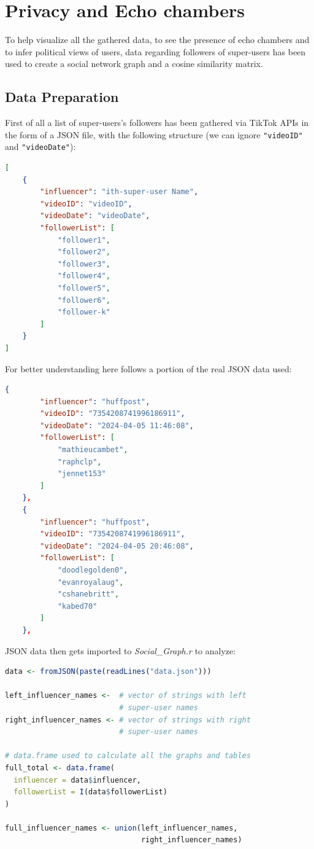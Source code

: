 \section{Privacy and Echo chambers}
To help visualize all the gathered data, to see the presence of echo chambers and to infer political views of users, data regarding followers of super-users has been used to create a social network graph and a cosine similarity matrix.

\subsection{Data Preparation}
First of all a list of super-users's followers has been gathered via TikTok APIs in the form of a JSON file, with the following structure (we can ignore \verb+"videoID"+ and \verb+"videoDate"+):

\begin{lstlisting}[language=json]
[
    {
        "influencer": "ith-super-user Name",
        "videoID": "videoID",
        "videoDate": "videoDate",
        "followerList": [
            "follower1",
            "follower2",
            "follower3",
            "follower4",
            "follower5",
            "follower6",
            "follower-k"
        ]
    }
]
\end{lstlisting}

For better understanding here follows a portion of the real JSON data used:

\begin{lstlisting}[language=json]
    {
        "influencer": "huffpost",
        "videoID": "7354208741996186911",
        "videoDate": "2024-04-05 11:46:08",
        "followerList": [
            "mathieucambet",
            "raphclp",
            "jennet153"
        ]
    },
    {
        "influencer": "huffpost",
        "videoID": "7354208741996186911",
        "videoDate": "2024-04-05 20:46:08",
        "followerList": [
            "doodlegolden0",
            "evanroyalaug",
            "cshanebritt",
            "kabed70"
        ]
    },
\end{lstlisting}

JSON data then gets imported to \textit{Social\_Graph.r} to analyze:

\begin{lstlisting}[language=R]
data <- fromJSON(paste(readLines("data.json")))

left_influencer_names <-  # vector of strings with left 
                          # super-user names
right_influencer_names <- # vector of strings with right 
                          # super-user names

# data.frame used to calculate all the graphs and tables
full_total <- data.frame(
  influencer = data$influencer,
  followerList = I(data$followerList)
)

full_influencer_names <- union(left_influencer_names, 
                               right_influencer_names)
\end{lstlisting}

